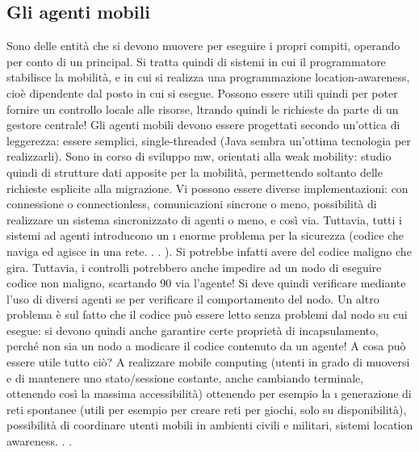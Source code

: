 \subsection{Gli agenti mobili}
Sono delle entità che si devono muovere per eseguire i propri compiti, operando
per conto di un principal. Si tratta quindi di sistemi in cui il programmatore stabilisce la mobilità, e in cui si
realizza una programmazione location-awareness,
cioè dipendente dal posto in cui si esegue. Possono essere utili quindi per poter
fornire un controllo locale alle risorse, ltrando quindi le richieste da parte di un
gestore centrale! Gli agenti mobili devono essere progettati secondo un'ottica di
leggerezza: essere semplici, single-threaded (Java sembra un'ottima tecnologia
per realizzarli). Sono in corso di sviluppo mw, orientati alla weak mobility:
studio quindi di strutture dati apposite per la mobilità, permettendo soltanto
delle richieste esplicite alla migrazione.
Vi possono essere diverse implementazioni: con connessione o connectionless,
comunicazioni sincrone o meno, possibilità di realizzare un sistema sincronizzato
di agenti o meno, e così via. Tuttavia, tutti i sistemi ad agenti introducono un
\i{}
enorme problema per la sicurezza (codice che naviga ed agisce in una rete. . . ). Si
potrebbe infatti avere del codice maligno che gira. Tuttavia, i controlli potrebbero anche impedire ad un nodo di
eseguire codice non maligno, scartando
90
via l'agente! Si deve quindi verificare mediante l'uso di diversi agenti se per
verificare il comportamento del nodo.
Un altro problema è sul fatto che il codice può essere letto senza problemi
dal nodo su cui esegue: si devono quindi anche garantire certe proprietà di
incapsulamento, perché non sia un nodo a modicare il codice contenuto da un
agente!
A cosa può essere utile tutto ciò? A realizzare mobile computing (utenti in
grado di muoversi e di mantenere uno stato/sessione costante, anche cambiando
terminale, ottenendo così la massima accessibilità) ottenendo per esempio la
\i{}
generazione di reti spontanee (utili per esempio per creare reti per giochi, solo su
disponibilità), possibilità di coordinare utenti mobili in ambienti civili e militari,
sistemi location awareness. . .